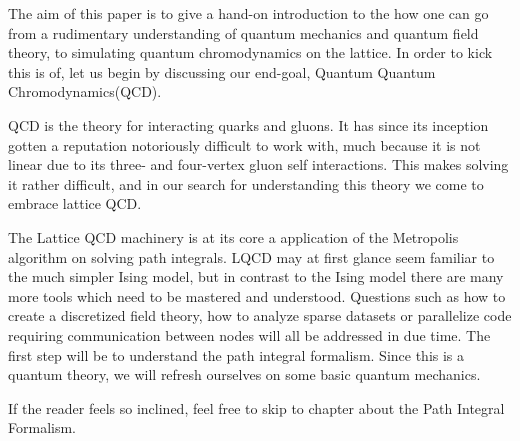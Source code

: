 The aim of this paper is to give a hand-on introduction to the how one can go from a rudimentary understanding of quantum mechanics and quantum field theory, to simulating quantum chromodynamics on the lattice. In order to kick this is of, let us begin by discussing our end-goal, Quantum Quantum Chromodynamics(QCD).

QCD is the theory for interacting quarks and gluons. It has since its inception gotten a reputation notoriously difficult to work with, much because it is not linear due to its three- and four-vertex gluon self interactions. This makes solving it rather difficult, and in our search for understanding this theory we come to embrace lattice QCD.

The Lattice QCD machinery is at its core a application of the Metropolis algorithm on solving path integrals. LQCD may at first glance seem familiar to the much simpler Ising model, but in contrast to the Ising model there are many more tools which need to be mastered and understood. Questions such as how to create a discretized field theory, how to analyze sparse datasets or parallelize code requiring communication between nodes will all be addressed in due time. The first step will be to understand the path integral formalism. Since this is a quantum theory, we will refresh ourselves on some basic quantum mechanics. 

If the reader feels so inclined, feel free to skip to chapter about the Path Integral Formalism.